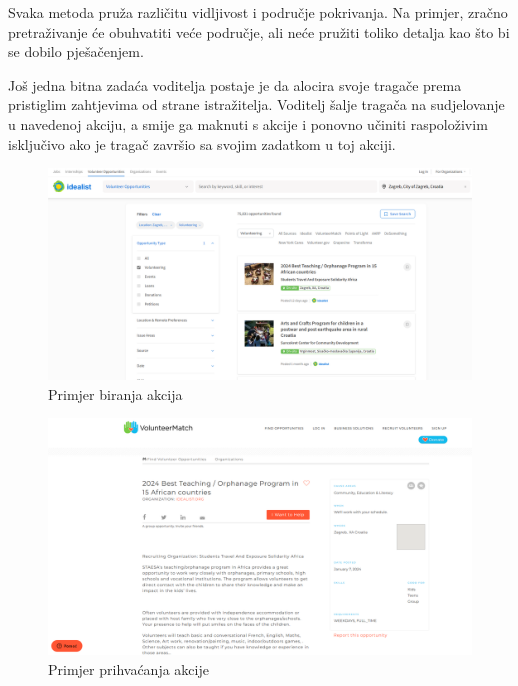 		Svaka metoda pruža različitu vidljivost i područje pokrivanja. Na primjer, zračno pretraživanje će obuhvatiti veće područje, ali neće pružiti toliko detalja kao što bi se dobilo pješačenjem.
		
		Još jedna bitna zadaća voditelja postaje je da alocira svoje tragače prema pristiglim zahtjevima od strane istražitelja. Voditelj šalje tragača na sudjelovanje u navedenoj akciju, a smije ga maknuti s akcije i ponovno učiniti raspoloživim isključivo ako je tragač završio sa svojim zadatkom u toj akciji.
		
	\begin{figure}[H]
			\includegraphics[scale=0.35]{slike/pr_biranje_akcije.PNG} %
			\centering
			\caption{Primjer biranja akcija}
			\label{fig:promjene}
		\end{figure}
		
		\begin{figure}[H]
			\includegraphics[scale=0.35]{slike/pr_prihvacanje_akcije.PNG} %
			\centering
			\caption{Primjer prihvaćanja akcije}
			\label{fig:promjene}
		\end{figure}
		
